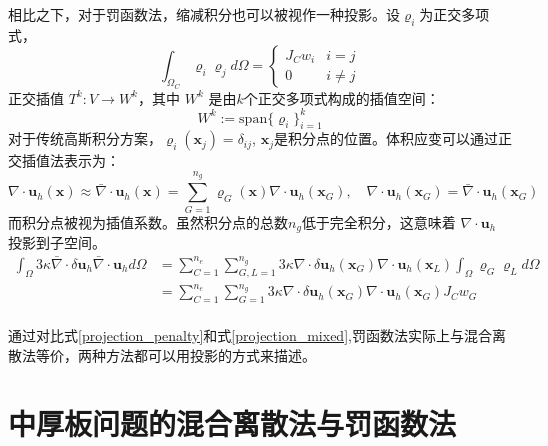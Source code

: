 相比之下，对于罚函数法，缩减积分也可以被视作一种投影。设$\varrho_i$为正交多项式，
\begin{equation}
    \int_{\Omega_C} \varrho_i \varrho_j d\Omega = 
    \begin{cases}
        J_C w_i  & i = j \\
        0 & i \ne j
    \end{cases}
\end{equation}
正交插值 $T^{k}: V \rightarrow W^{k}$，其中 $W^{k}$ 是由$k$个正交多项式构成的插值空间：
\begin{equation}
    W^{k}:= \mathrm{span}\{\varrho_i \}_{i=1}^{k}
\end{equation}
对于传统高斯积分方案，$\varrho_i(\boldsymbol x_j) = \delta_{ij}$, $\boldsymbol x_j$是积分点的位置。体积应变可以通过正交插值法表示为：
\begin{equation}
    \nabla \cdot \boldsymbol u_h(\boldsymbol x) \approx \bar \nabla \cdot \boldsymbol u_h(\boldsymbol x) = \sum_{G=1}^{n_g} \varrho_G(\boldsymbol x) \nabla \cdot \boldsymbol u_h(\boldsymbol x_G), \quad \nabla \cdot \boldsymbol u_h(\boldsymbol x_G) = \bar \nabla \cdot \boldsymbol u_h(\boldsymbol x_G)
\end{equation}
而积分点被视为插值系数。虽然积分点的总数$n_g$低于完全积分，这意味着 $\nabla \cdot \boldsymbol u_h$ 投影到子空间。
\begin{equation}\label{projection_penalty}
    \begin{split}
        \int_\Omega 3\kappa \bar \nabla \cdot \delta \boldsymbol u_h \bar \nabla \cdot \boldsymbol u_h d\Omega
        &= \sum_{C=1}^{n_e} \sum_{G,L=1}^{n_g} 3\kappa \nabla \cdot \delta \boldsymbol u_h(\boldsymbol x_G) \nabla \cdot \boldsymbol u_h(\boldsymbol x_L) \int_\Omega \varrho_G \varrho_L d\Omega  \\
        &= \sum_{C=1}^{n_e} \sum_{G=1}^{n_g} 3\kappa \nabla \cdot \delta \boldsymbol u_h(\boldsymbol x_G) \nabla \cdot \boldsymbol u_h(\boldsymbol x_G) J_C w_G \\
    \end{split}
\end{equation}

通过对比式\eqref{projection_penalty}和式\eqref{projection_mixed},罚函数法实际上与混合离散法等价，两种方法都可以用投影的方式来描述。

\section{中厚板问题的混合离散法与罚函数法}      
